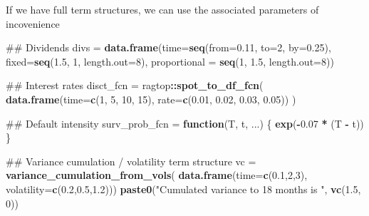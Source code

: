 \documentclass[]{article}
\newenvironment{Shaded}{\begin{snugshade}}{\end{snugshade}}
\newcommand{\KeywordTok}[1]{\textcolor[rgb]{0.13,0.29,0.53}{\textbf{#1}}}
\newcommand{\DataTypeTok}[1]{\textcolor[rgb]{0.13,0.29,0.53}{#1}}
\newcommand{\DecValTok}[1]{\textcolor[rgb]{0.00,0.00,0.81}{#1}}
\newcommand{\FloatTok}[1]{\textcolor[rgb]{0.00,0.00,0.81}{#1}}
\newcommand{\StringTok}[1]{\textcolor[rgb]{0.31,0.60,0.02}{#1}}
\newcommand{\ControlFlowTok}[1]{\textcolor[rgb]{0.13,0.29,0.53}{\textbf{#1}}}
\newcommand{\OperatorTok}[1]{\textcolor[rgb]{0.81,0.36,0.00}{\textbf{#1}}}
\newcommand{\NormalTok}[1]{#1}
\begin{document}
If we have full term structures, we can use the associated parameters of
incovenience

\begin{Shaded}
\begin{Highlighting}[]
\NormalTok{## Dividends}
\NormalTok{divs =}\StringTok{ }\KeywordTok{data.frame}\NormalTok{(}\DataTypeTok{time=}\KeywordTok{seq}\NormalTok{(}\DataTypeTok{from=}\FloatTok{0.11}\NormalTok{, }\DataTypeTok{to=}\DecValTok{2}\NormalTok{, }\DataTypeTok{by=}\FloatTok{0.25}\NormalTok{),}
                  \DataTypeTok{fixed=}\KeywordTok{seq}\NormalTok{(}\FloatTok{1.5}\NormalTok{, }\DecValTok{1}\NormalTok{, }\DataTypeTok{length.out=}\DecValTok{8}\NormalTok{),}
                  \DataTypeTok{proportional =} \KeywordTok{seq}\NormalTok{(}\DecValTok{1}\NormalTok{, }\FloatTok{1.5}\NormalTok{, }\DataTypeTok{length.out=}\DecValTok{8}\NormalTok{))}

\NormalTok{## Interest rates}
\NormalTok{disct_fcn =}\StringTok{ }\NormalTok{ragtop}\OperatorTok{::}\KeywordTok{spot_to_df_fcn}\NormalTok{(}
  \KeywordTok{data.frame}\NormalTok{(}\DataTypeTok{time=}\KeywordTok{c}\NormalTok{(}\DecValTok{1}\NormalTok{, }\DecValTok{5}\NormalTok{, }\DecValTok{10}\NormalTok{, }\DecValTok{15}\NormalTok{),}
             \DataTypeTok{rate=}\KeywordTok{c}\NormalTok{(}\FloatTok{0.01}\NormalTok{, }\FloatTok{0.02}\NormalTok{, }\FloatTok{0.03}\NormalTok{, }\FloatTok{0.05}\NormalTok{))}
\NormalTok{)}

\NormalTok{## Default intensity}
\NormalTok{surv_prob_fcn =}\StringTok{ }\ControlFlowTok{function}\NormalTok{(T, t, ...) \{}
  \KeywordTok{exp}\NormalTok{(}\OperatorTok{-}\FloatTok{0.07} \OperatorTok{*}\StringTok{ }\NormalTok{(T }\OperatorTok{-}\StringTok{ }\NormalTok{t)) \}}

\NormalTok{## Variance cumulation / volatility term structure}
\NormalTok{vc =}\StringTok{ }\KeywordTok{variance_cumulation_from_vols}\NormalTok{(}
   \KeywordTok{data.frame}\NormalTok{(}\DataTypeTok{time=}\KeywordTok{c}\NormalTok{(}\FloatTok{0.1}\NormalTok{,}\DecValTok{2}\NormalTok{,}\DecValTok{3}\NormalTok{),}
              \DataTypeTok{volatility=}\KeywordTok{c}\NormalTok{(}\FloatTok{0.2}\NormalTok{,}\FloatTok{0.5}\NormalTok{,}\FloatTok{1.2}\NormalTok{)))}
\KeywordTok{paste0}\NormalTok{(}\StringTok{"Cumulated variance to 18 months is "}\NormalTok{, }\KeywordTok{vc}\NormalTok{(}\FloatTok{1.5}\NormalTok{, }\DecValTok{0}\NormalTok{))}
\end{Highlighting}
\end{Shaded}
\end{document}
